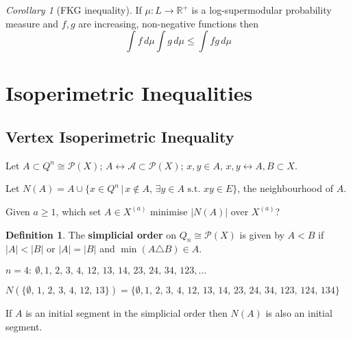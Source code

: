 \documentclass[a4paper]{article}
\theoremstyle{definition}
\newtheorem*{definition}{Definition}
\theoremstyle{remark}
\theoremstyle{default}
\newtheorem{corollary}[theorem]{Corollary}
\newcommand*\abs[1]{\left|#1\right|}
\begin{document}
\begin{corollary}[FKG inequality]
	If $\mu: L \to \mathbb{R}^+$ is a log-supermodular probability measure and $f, g$ are increasing, non-negative functions then
	$$\int f \,d\mu \int g \,d \mu \leq \int fg \,d\mu$$
\end{corollary}

\section{Isoperimetric Inequalities}
\setcounter{theorem}{0}
\subsection{Vertex Isoperimetric Inequality}
Let $A \subset Q^n \cong \mathcal{P}(X)$;
$A \leftrightarrow \mathcal{A} \subset \mathcal{P}(X)$;
$x,y \in A$, $x, y \leftrightarrow A,B \subset X$.

Let $N(A) = A \cup \{x \in Q^n \,|\, x \not\in A,\, \exists y \in A \text{ s.t. } xy \in E \}$,
the neighbourhood of $A$.

Given $a \geq 1$, which set $A \in X^{(a)}$ minimise $\abs{N(A)}$ over $X^{(a)}$?

\begin{definition}
	The \textbf{simplicial order} on $Q_n \cong \mathcal{P}(X)$ is given by $A < B$ if $\abs{A} < \abs{B}$
	or $\abs{A} = \abs{B}$ and $\min(A \triangle B) \in A$.
\end{definition}

$n=4:\ \emptyset, 1,\, 2,\, 3,\, 4,\, 12,\, 13,\, 14,\, 23,\, 24,\, 34,\, 123, \dots$

$N(\{\emptyset,\, 1,\, 2,\, 3,\, 4,\, 12,\, 13\}) = \{\emptyset, 1,\, 2,\, 3,\, 4,\, 12,\, 13,\, 14,\, 23,\, 24,\, 34,\, 123,\, 124,\, 134\}$

If $A$ is an initial segment in the simplicial order then $N(A)$ is also an initial segment.
\end{document}
